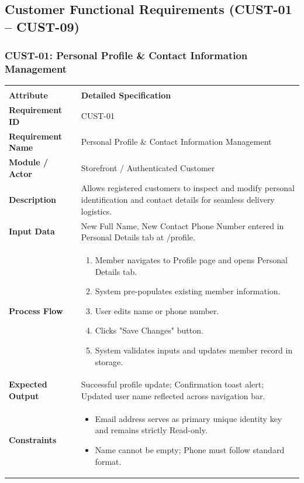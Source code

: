 \documentclass[12pt,a4paper,oneside]{report}
\begin{document}
\subsection{Customer Functional Requirements (CUST-01 -- CUST-09)}

\subsubsection{CUST-01: Personal Profile \& Contact Information Management}
\begin{longtable}{|p{3.6cm}|p{11.9cm}|}
\hline
\rowcolor{PrimaryBrown}
\multicolumn{2}{|p{15.5cm}|}{\textbf{\textcolor{white}{Functional Specification: CUST-01 -- Personal Profile \& Contact Information Management}}} \\
\hline
\endfirsthead
\hline
\rowcolor{PrimaryBrown}
\multicolumn{2}{|p{15.5cm}|}{\textbf{\textcolor{white}{Functional Specification: CUST-01 (Continued)}}} \\
\hline
\textbf{Attribute} & \textbf{Detailed Specification} \\
\hline
\endhead
\hline
\endfoot
\textbf{Requirement ID} & CUST-01 \\
\hline
\textbf{Requirement Name} & Personal Profile \& Contact Information Management \\
\hline
\textbf{Module / Actor} & Storefront / Authenticated Customer \\
\hline
\textbf{Description} & Allows registered customers to inspect and modify personal identification and contact details for seamless delivery logistics. \\
\hline
\textbf{Input Data} & New Full Name, New Contact Phone Number entered in Personal Details tab at /profile. \\
\hline
\textbf{Process Flow} & \begin{enumerate}[leftmargin=*,nosep,topsep=2pt]
  \item Member navigates to Profile page and opens Personal Details tab.
  \item System pre-populates existing member information.
  \item User edits name or phone number.
  \item Clicks "Save Changes" button.
  \item System validates inputs and updates member record in storage.
\end{enumerate} \\
\hline
\textbf{Expected Output} & Successful profile update; Confirmation toast alert; Updated user name reflected across navigation bar. \\
\hline
\textbf{Constraints} & \begin{itemize}[leftmargin=*,nosep,topsep=2pt]
  \item Email address serves as primary unique identity key and remains strictly Read-only.
  \item Name cannot be empty; Phone must follow standard format.
\end{itemize} \\
\hline
\end{longtable}
\end{document}
